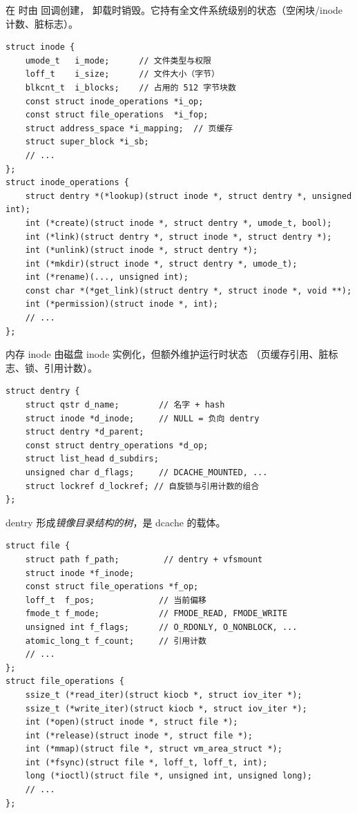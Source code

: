 \begin{filesystemlayout}
 在  时由  回调创建，
卸载时销毁。它持有全文件系统级别的状态（空闲块/inode 计数、脏标志）。


\begin{lstlisting}
struct inode {
    umode_t   i_mode;      // 文件类型与权限
    loff_t    i_size;      // 文件大小（字节）
    blkcnt_t  i_blocks;    // 占用的 512 字节块数
    const struct inode_operations *i_op;
    const struct file_operations  *i_fop;
    struct address_space *i_mapping;  // 页缓存
    struct super_block *i_sb;
    // ...
};
struct inode_operations {
    struct dentry *(*lookup)(struct inode *, struct dentry *, unsigned int);
    int (*create)(struct inode *, struct dentry *, umode_t, bool);
    int (*link)(struct dentry *, struct inode *, struct dentry *);
    int (*unlink)(struct inode *, struct dentry *);
    int (*mkdir)(struct inode *, struct dentry *, umode_t);
    int (*rename)(..., unsigned int);
    const char *(*get_link)(struct dentry *, struct inode *, void **);
    int (*permission)(struct inode *, int);
    // ...
};
\end{lstlisting}

内存 inode 由磁盘 inode 实例化，但额外维护运行时状态
（页缓存引用、脏标志、锁、引用计数）。


\begin{lstlisting}
struct dentry {
    struct qstr d_name;        // 名字 + hash
    struct inode *d_inode;     // NULL = 负向 dentry
    struct dentry *d_parent;
    const struct dentry_operations *d_op;
    struct list_head d_subdirs;
    unsigned char d_flags;     // DCACHE_MOUNTED, ...
    struct lockref d_lockref; // 自旋锁与引用计数的组合
};
\end{lstlisting}

dentry 形成\emph{镜像目录结构的树}，是 dcache 的载体。


\begin{lstlisting}
struct file {
    struct path f_path;         // dentry + vfsmount
    struct inode *f_inode;
    const struct file_operations *f_op;
    loff_t  f_pos;             // 当前偏移
    fmode_t f_mode;            // FMODE_READ, FMODE_WRITE
    unsigned int f_flags;      // O_RDONLY, O_NONBLOCK, ...
    atomic_long_t f_count;     // 引用计数
    // ...
};
struct file_operations {
    ssize_t (*read_iter)(struct kiocb *, struct iov_iter *);
    ssize_t (*write_iter)(struct kiocb *, struct iov_iter *);
    int (*open)(struct inode *, struct file *);
    int (*release)(struct inode *, struct file *);
    int (*mmap)(struct file *, struct vm_area_struct *);
    int (*fsync)(struct file *, loff_t, loff_t, int);
    long (*ioctl)(struct file *, unsigned int, unsigned long);
    // ...
};
\end{lstlisting}


\end{filesystemlayout}
